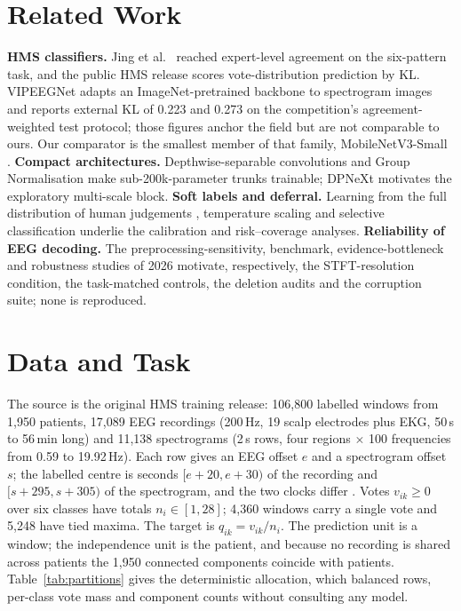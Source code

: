 \documentclass[sigconf,anonymous]{acmart}
\begin{document}
\section{Related Work}
\textbf{HMS classifiers.} Jing et al.\ \cite{jing2023} reached expert-level agreement on the six-pattern task, and the public HMS release \cite{hms2024} scores vote-distribution prediction by KL. VIPEEGNet \cite{sun2025vipeegnet} adapts an ImageNet-pretrained backbone to spectrogram images and reports external KL of 0.223 and 0.273 on the competition's agreement-weighted test protocol; those figures anchor the field but are not comparable to ours. Our comparator is the smallest member of that family, MobileNetV3-Small \cite{howard2019mobilenetv3}. \textbf{Compact architectures.} Depthwise-separable convolutions \cite{howard2017mobilenets} and Group Normalisation \cite{wu2018groupnorm} make sub-200k-parameter trunks trainable; DPNeXt \cite{kang2026dpnext} motivates the exploratory multi-scale block. \textbf{Soft labels and deferral.} Learning from the full distribution of human judgements \cite{peterson2019human}, temperature scaling \cite{guo2017calibration} and selective classification \cite{geifman2017selective} underlie the calibration and risk--coverage analyses. \textbf{Reliability of EEG decoding.} The preprocessing-sensitivity, benchmark, evidence-bottleneck and robustness studies of 2026 \cite{hou2026samebrain,kontras2026neuroatlas,wang2026evidence,mohammadi2026robustseiz} motivate, respectively, the STFT-resolution condition, the task-matched controls, the deletion audits and the corruption suite; none is reproduced.

\section{Data and Task}
\label{sec:data}
The source is the original HMS training release: 106,800 labelled windows from 1,950 patients, 17,089 EEG recordings (200\,Hz, 19 scalp electrodes plus EKG, 50\,s to 56\,min long) and 11,138 spectrograms (2\,s rows, four regions $\times$ 100 frequencies from 0.59 to 19.92\,Hz). Each row gives an EEG offset $e$ and a spectrogram offset $s$; the labelled centre is seconds $[e{+}20,e{+}30)$ of the recording and $[s{+}295,s{+}305)$ of the spectrogram, and the two clocks differ \cite{hms2024}. Votes $v_{ik}\ge 0$ over six classes have totals $n_i\in[1,28]$; 4,360 windows carry a single vote and 5,248 have tied maxima. The target is $q_{ik}=v_{ik}/n_i$. The prediction unit is a window; the independence unit is the patient, and because no recording is shared across patients the 1,950 connected components coincide with patients. Table~\ref{tab:partitions} gives the deterministic allocation, which balanced rows, per-class vote mass and component counts without consulting any model.
\end{document}
